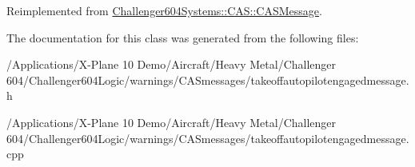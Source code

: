 Reimplemented from \hyperlink{class_challenger604_systems_1_1_c_a_s_1_1_c_a_s_message_a6296584e1a8eff970892c65ce66e8111}{Challenger604\-Systems\-::\-C\-A\-S\-::\-C\-A\-S\-Message}.



The documentation for this class was generated from the following files\-:\begin{DoxyCompactItemize}
\item 
/\-Applications/\-X-\/\-Plane 10 Demo/\-Aircraft/\-Heavy Metal/\-Challenger 604/\-Challenger604\-Logic/warnings/\-C\-A\-Smessages/takeoffautopilotengagedmessage.\-h\item 
/\-Applications/\-X-\/\-Plane 10 Demo/\-Aircraft/\-Heavy Metal/\-Challenger 604/\-Challenger604\-Logic/warnings/\-C\-A\-Smessages/takeoffautopilotengagedmessage.\-cpp\end{DoxyCompactItemize}
